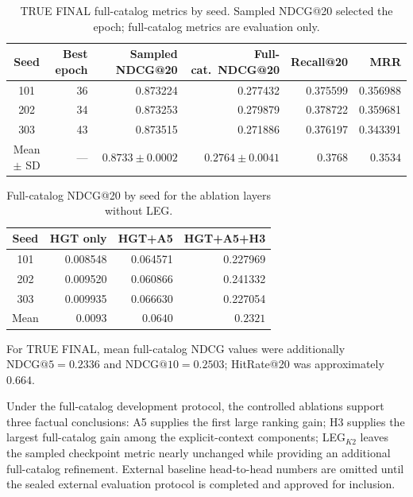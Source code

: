 \begin{table}[htbp]
\centering
\footnotesize
\caption{TRUE FINAL full-catalog metrics by seed.
Sampled NDCG@20 selected the epoch; full-catalog metrics are evaluation only.}
\label{tab:lastfm-true-final}
\setlength{\tabcolsep}{3pt}
\begin{tabular}{@{}crrrrr@{}}
\toprule
Seed & Best epoch & Sampled NDCG@20 & Full-cat.\ NDCG@20 & Recall@20 & MRR \\
\midrule
101 & 36 & 0.873224 & 0.277432 & 0.375599 & 0.356988 \\
202 & 34 & 0.873253 & 0.279879 & 0.378722 & 0.359681 \\
303 & 43 & 0.873515 & 0.271886 & 0.376197 & 0.343391 \\
\midrule
Mean \(\pm\) SD & --- & \(0.8733\pm 0.0002\) & \(0.2764\pm 0.0041\) & \(0.3768\) & \(0.3534\) \\
\bottomrule
\end{tabular}
\end{table}

\begin{table}[htbp]
\centering
\small
\caption{Full-catalog NDCG@20 by seed for the ablation layers without LEG.}
\label{tab:lastfm-fullrank-ablation}
\setlength{\tabcolsep}{4pt}
\begin{tabular}{crrr}
\toprule
Seed & HGT only & HGT+A5 & HGT+A5+H3 \\
\midrule
101 & 0.008548 & 0.064571 & 0.227969 \\
202 & 0.009520 & 0.060866 & 0.241332 \\
303 & 0.009935 & 0.066630 & 0.227054 \\
\midrule
Mean & \(0.0093\) & \(0.0640\) & \(0.2321\) \\
\bottomrule
\end{tabular}
\end{table}

For TRUE FINAL, mean full-catalog NDCG values were additionally $\mathrm{NDCG}@5=0.2336$ and $\mathrm{NDCG}@10=0.2503$; HitRate@20 was approximately $0.664$.

Under the full-catalog development protocol, the controlled ablations support three factual conclusions:
A5 supplies the first large ranking gain;
H3 supplies the largest full-catalog gain among the explicit-context components;
LEG$_{K2}$ leaves the sampled checkpoint metric nearly unchanged while providing an additional full-catalog refinement.
External baseline head-to-head numbers are omitted until the sealed external evaluation protocol is completed and approved for inclusion.
